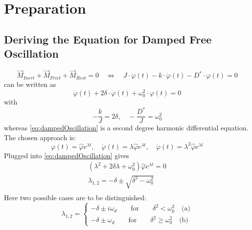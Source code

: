 \section{Preparation}
%
    \subsection{Deriving the Equation for Damped Free Oscillation}\label{sec:preparation_task_1}
        \begin{equation}
            \vec{M}_{ Inert } + \vec{M}_{ Frict } + \vec{ M}_{ Rest } = 0 \quad \Leftrightarrow \quad J \cdot \ddot\varphi(t) - k \cdot \dot\varphi(t) - D^* \cdot \varphi(t) = 0
        \end{equation}
        can be written as
        \begin{equation}
            \ddot\varphi(t) + 2 \delta \cdot \dot\varphi(t) + \omega_0^2 \cdot \varphi(t) = 0
            \label{eq:dampedOscillation}
        \end{equation}
        with
        \begin{equation}
            -\frac{k}{J} = 2\delta, \quad -\frac{D^*}{J} = \omega_0^2
            \label{eq:DEParameters}
        \end{equation}
        whereas \cref{eq:dampedOscillation} is a second degree harmonic differential equation.
        The chosen approach is:
        \begin{equation}
            \varphi(t) = \hat{\varphi} e^{\lambda t}, \quad \dot{\varphi}(t) = \lambda \hat{\varphi} e^{\lambda t}, \quad \ddot{\varphi}(t) = \lambda^2 \hat{\varphi} e^{\lambda t}
        \end{equation}
        Plugged into \cref{eq:dampedOscillation} gives
        \begin{align}
            \left(\lambda^2 + 2\delta \lambda + \omega_0^2\right) \hat{\varphi}e^{\lambda t} = 0 \nonumber \\
            \lambda_{1,2} = -\delta \pm \sqrt{\delta^2-\omega_0^2} \nonumber \\
        \end{align}
        Here two possible cases are to be distinguished:
        \begin{equation}
            \lambda_{1,2} =
            \begin{cases}
                    -\delta \pm i\omega_d \qquad \text{for} \qquad \delta^2 < \omega_0^2 \quad \text{(a)}\\
                    -\delta \pm \omega_d \qquad \text{for} \qquad \delta^2 \geq \omega_0^2 \quad \text{(b)}
            \end{cases}
        \end{equation}

